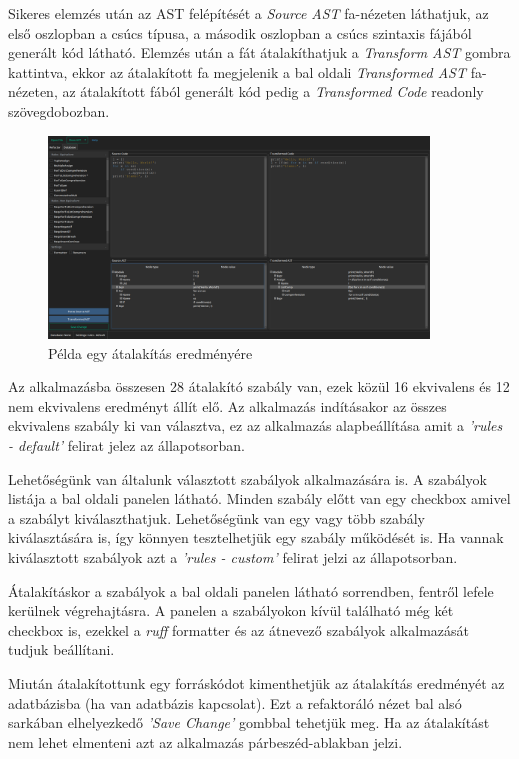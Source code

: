 Sikeres elemzés után az AST felépítését a \emph{Source AST} fa-nézeten láthatjuk, 
az első oszlopban a csúcs típusa, a második oszlopban a csúcs szintaxis fájából generált kód látható. 
Elemzés után a fát átalakíthatjuk a \emph{Transform AST} gombra kattintva, 
ekkor az átalakított fa megjelenik a bal oldali \emph{Transformed AST} fa-nézeten,
az átalakított fából generált kód pedig a \emph{Transformed Code} readonly szövegdobozban.

\begin{figure}[H]
	\centering
	\includegraphics[width=0.9\textwidth]{images/screenshots/refactor_tab_2.png}
	\caption{Példa egy átalakítás eredményére}
\end{figure}

Az alkalmazásba összesen 28 átalakító szabály van, ezek közül 16 ekvivalens és 12 nem ekvivalens
eredményt állít elő.
Az alkalmazás indításakor az összes ekvivalens szabály ki van választva,
ez az alkalmazás alapbeállítása amit a \emph{'rules - default'} felirat jelez az állapotsorban.

Lehetőségünk van általunk választott szabályok alkalmazására is.
A szabályok listája a bal oldali panelen látható. Minden szabály előtt van egy checkbox
amivel a szabályt kiválaszthatjuk. Lehetőségünk van egy vagy több szabály kiválasztására is,
így könnyen tesztelhetjük egy szabály működését is.
Ha vannak kiválasztott szabályok azt a \emph{'rules - custom'} felirat jelzi az állapotsorban.

Átalakításkor a szabályok a bal oldali panelen látható sorrendben, fentről lefele kerülnek végrehajtásra.
A panelen a szabályokon kívül található még két checkbox is,
ezekkel a \emph{ruff} formatter és az átnevező szabályok alkalmazását tudjuk beállítani.

Miután átalakítottunk egy forráskódot kimenthetjük az átalakítás eredményét az adatbázisba
(ha van adatbázis kapcsolat).
Ezt a refaktoráló nézet bal alsó sarkában elhelyezkedő \emph{'Save Change'} gombbal tehetjük meg.
Ha az átalakítást nem lehet elmenteni azt az alkalmazás párbeszéd-ablakban jelzi.

